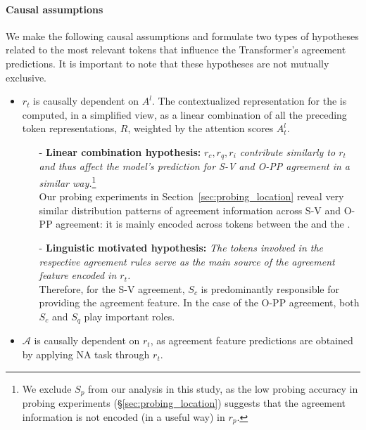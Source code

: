 \paragraph{Causal assumptions} We make the following causal assumptions and formulate two types of hypotheses related to the most relevant tokens that influence the Transformer's agreement predictions. It is important to note that these hypotheses are not mutually exclusive.  
\begin{itemize}
    \item $r_t$ is causally dependent on $A^l$. The contextualized representation for the \target is computed, in a simplified view, as a linear combination of all the preceding token representations, $R$, weighted by the attention scores $A^l_t$.
    \begin{itemize}
        \item[-]  \textbf{Linear combination hypothesis:}  \textit{$r_c,r_q,r_i$ contribute similarly to $r_t$ and thus affect the model's prediction for S-V and O-PP agreement in a similar way.}\footnote{We exclude $S_p$ from our analysis in this study, as the low probing accuracy in probing experiments (\S\ref{sec:probing_location}) suggests that the agreement information is not encoded (in a useful way) in $r_p$. } \\
        Our probing experiments in Section~\ref{sec:probing_location} reveal very similar distribution patterns of agreement information across S-V and O-PP agreement: it is mainly encoded across tokens between the \cue and the \target.  
    \item[-] \textbf{Linguistic motivated hypothesis:} \textit{The tokens involved in the respective agreement rules serve as the main source of the agreement feature encoded in $r_t$.} \\ 
    Therefore, for the S-V agreement, $S_c$ is predominantly responsible for providing the agreement feature. In the case of the O-PP agreement, both $S_c$ and $S_q$ play important roles.
    \end{itemize}
    \item $\mathcal{A}$ is causally dependent on $r_t$, as agreement feature predictions are obtained by applying NA task through $r_t$.
\end{itemize}


